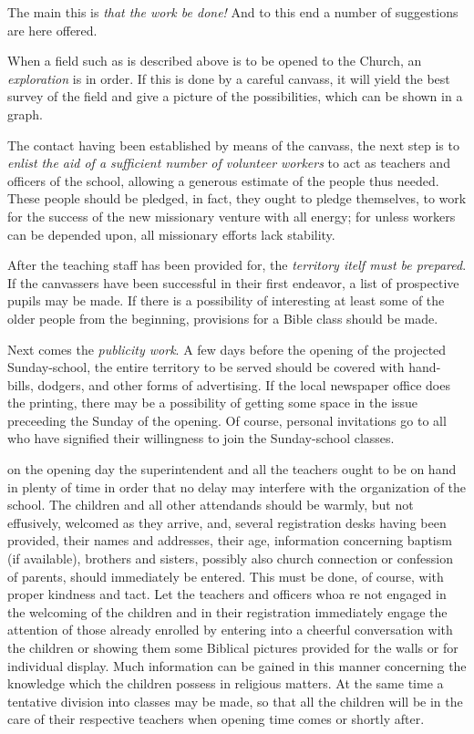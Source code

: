 \documentclass[
]{book}
\begin{document}
The main this is \emph{that the work be done!} And to this end a number of suggestions are here offered.

When a field such as is described above is to be opened to the Church, an \emph{exploration} is in order. If this is done by a careful canvass, it will yield the best survey of the field and give a picture of the possibilities, which can be shown in a graph.

The contact having been established by means of the canvass, the next step is to \emph{enlist the aid of a sufficient number of volunteer workers} to act as teachers and officers of the school, allowing a generous estimate of the people thus needed. These people should be pledged, in fact, they ought to pledge themselves, to work for the success of the new missionary venture with all energy; for unless workers can be depended upon, all missionary efforts lack stability.

After the teaching staff has been provided for, the \emph{territory itelf must be prepared}. If the canvassers have been successful in their first endeavor, a list of prospective pupils may be made. If there is a possibility of interesting at least some of the older people from the beginning, provisions for a Bible class should be made.

Next comes the \emph{publicity work}. A few days before the opening of the projected Sunday-school, the entire territory to be served should be covered with hand-bills, dodgers, and other forms of advertising. If the local newspaper office does the printing, there may be a possibility of getting some space in the issue preceeding the Sunday of the opening. Of course, personal invitations go to all who have signified their willingness to join the Sunday-school classes.

on the opening day the superintendent and all the teachers ought to be on hand in plenty of time in order that no delay may interfere with the organization of the school. The children and all other attendands should be warmly, but not effusively, welcomed as they arrive, and, several registration desks having been provided, their names and addresses, their age, information concerning baptism (if available), brothers and sisters, possibly also church connection or confession of parents, should immediately be entered. This must be done, of course, with proper kindness and tact. Let the teachers and officers whoa re not engaged in the welcoming of the children and in their registration immediately engage the attention of those already enrolled by entering into a cheerful conversation with the children or showing them some Biblical pictures provided for the walls or for individual display. Much information can be gained in this manner concerning the knowledge which the children possess in religious matters. At the same time a tentative division into classes may be made, so that all the children will be in the care of their respective teachers when opening time comes or shortly after.
\end{document}

